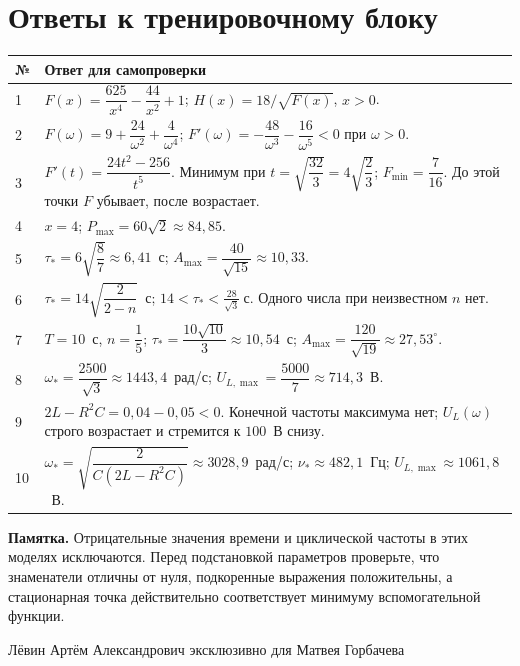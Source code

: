 \documentclass[a4paper,12pt]{article}
\begin{document}
\section*{Ответы к тренировочному блоку}
\small
\begin{longtable}{@{}p{11mm}p{\dimexpr\linewidth-18mm\relax}@{}}
\toprule
\textbf{№} & \textbf{Ответ для самопроверки}\\
\midrule
\endhead
1 & $F(x)=\dfrac{625}{x^4}-\dfrac{44}{x^2}+1$; $H(x)=18/\sqrt{F(x)}$, $x>0$.\\[5pt]
2 & $F(\omega)=9+\dfrac{24}{\omega^2}+\dfrac4{\omega^4}$; $F'(\omega)=-\dfrac{48}{\omega^3}-\dfrac{16}{\omega^5}<0$ при $\omega>0$.\\[5pt]
3 & $F'(t)=\dfrac{24t^2-256}{t^5}$. Минимум при $t=\sqrt{\dfrac{32}{3}}=4\sqrt{\dfrac23}$; $F_{\min}=\dfrac7{16}$. До этой точки $F$ убывает, после возрастает.\\[5pt]
4 & $x=4$; $P_{\max}=60\sqrt2\approx84{,}85$.\\[5pt]
5 & $\tau_*=6\sqrt{\dfrac87}\approx6{,}41$~с; $A_{\max}=\dfrac{40}{\sqrt{15}}\approx10{,}33$.\\[5pt]
6 & $\tau_*=14\sqrt{\dfrac2{2-n}}$~с; $\displaystyle14<\tau_*<\frac{28}{\sqrt3}\ \text{с}$. Одного числа при неизвестном $n$ нет.\\[5pt]
7 & $T=10$~с, $n=\dfrac15$; $\tau_*=\dfrac{10\sqrt{10}}3\approx10{,}54$~с; $A_{\max}=\dfrac{120}{\sqrt{19}}\approx27{,}53^\circ$.\\[5pt]
8 & $\omega_*=\dfrac{2500}{\sqrt3}\approx1443{,}4$~рад/с; $U_{L,\max}=\dfrac{5000}{7}\approx714{,}3$~В.\\[5pt]
9 & $2L-R^2C=0{,}04-0{,}05<0$. Конечной частоты максимума нет; $U_L(\omega)$ строго возрастает и стремится к $100$~В снизу.\\[5pt]
10 & $\omega_*=\sqrt{\dfrac{2}{C(2L-R^2C)}}\approx3028{,}9$~рад/с; $\nu_*\approx482{,}1$~Гц; $U_{L,\max}\approx1061{,}8$~В.\\[2pt]
\bottomrule
\end{longtable}
\normalsize
\vspace{7mm}
\textbf{Памятка.} Отрицательные значения времени и циклической частоты в этих моделях исключаются. Перед подстановкой параметров проверьте, что знаменатели отличны от нуля, подкоренные выражения положительны, а стационарная точка действительно соответствует минимуму вспомогательной функции.

\vfill
\begin{center}\small\textcolor{muted}{Лёвин Артём Александрович эксклюзивно для Матвея Горбачева}\end{center}
\end{document}
